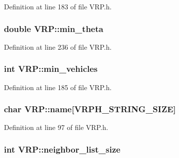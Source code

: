 Definition at line 183 of file VRP.h.

\hypertarget{class_v_r_p_a3690e58ce5c9ad561b338359181203f3}{
\subsubsection[{min\_\-theta}]{\setlength{\rightskip}{0pt plus 5cm}double {\bf VRP::min\_\-theta}}}
\label{class_v_r_p_a3690e58ce5c9ad561b338359181203f3}


Definition at line 236 of file VRP.h.

\hypertarget{class_v_r_p_ab48770e40f4f4ca52b032d6d1d33cde2}{
\subsubsection[{min\_\-vehicles}]{\setlength{\rightskip}{0pt plus 5cm}int {\bf VRP::min\_\-vehicles}}}
\label{class_v_r_p_ab48770e40f4f4ca52b032d6d1d33cde2}


Definition at line 185 of file VRP.h.

\hypertarget{class_v_r_p_af9d32e74c8941ce1ae12fdb057350dc3}{
\subsubsection[{name}]{\setlength{\rightskip}{0pt plus 5cm}char {\bf VRP::name}\mbox{[}VRPH\_\-STRING\_\-SIZE\mbox{]}}}
\label{class_v_r_p_af9d32e74c8941ce1ae12fdb057350dc3}


Definition at line 97 of file VRP.h.

\hypertarget{class_v_r_p_ac68b2c8f1b906dcce3b32a3c308240b3}{
\subsubsection[{neighbor\_\-list\_\-size}]{\setlength{\rightskip}{0pt plus 5cm}int {\bf VRP::neighbor\_\-list\_\-size}}}
\label{class_v_r_p_ac68b2c8f1b906dcce3b32a3c308240b3}


